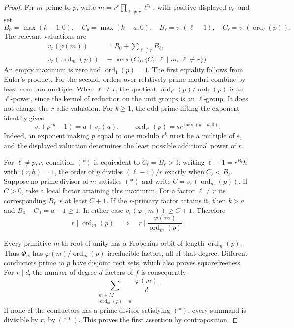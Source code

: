 \documentclass[11pt]{article}
\theoremstyle{definition}
\theoremstyle{remark}
\begin{document}
\begin{proof}
For $m$ prime to $p$, write
$m=r^k\prod_{\ell\ne r}\ell^{e_\ell}$, with positive displayed
$e_\ell$, and set
\[
 B_0=\max(k-1,0),\quad C_0=\max(k-a,0),\quad
 B_\ell=v_r(\ell-1),\quad
 C_\ell=v_r(\operatorname{ord}_\ell(p)).
\]
The relevant valuations are
\begin{align*}
 v_r(\varphi(m))&=B_0+\sum_{\ell\ne r}B_\ell,\\
 v_r(\operatorname{ord}_m(p))
   &=\max\bigl(C_0,\{C_\ell:\ell\mid m,\ \ell\ne r\}\bigr).
\end{align*}
An empty maximum is zero and $\operatorname{ord}_1(p)=1$.
The first equality follows from Euler's product.
For the second, orders over relatively prime moduli combine by least
common multiple.  When $\ell\ne r$, the quotient
$\operatorname{ord}_{\ell^{e}}(p)/\operatorname{ord}_\ell(p)$ is an
$\ell$-power, since the kernel of reduction on the unit groups is an
$\ell$-group.  It does not change the $r$-adic valuation.
For $k\ge1$, the odd-prime lifting-the-exponent identity gives
\[
 v_r(p^{su}-1)=a+v_r(u),\qquad
 \operatorname{ord}_{r^k}(p)=s r^{\max(k-a,0)}.
\]
Indeed, an exponent making $p$ equal to one modulo $r^k$ must be a
multiple of $s$, and the displayed valuation determines the least
possible additional power of $r$.

For $\ell\ne p,r$, condition \textup{\((*)\)} is equivalent to
$C_\ell=B_\ell>0$: writing $\ell-1=r^{B_\ell}h$ with $(r,h)=1$,
the order of $p$ divides $(\ell-1)/r$ exactly when
$C_\ell<B_\ell$.
Suppose no prime divisor of $m$ satisfies \textup{\((*)\)} and write
$C=v_r(\operatorname{ord}_m(p))$.
If $C>0$, take a local factor attaining this maximum.
For a factor $\ell\ne r$ its corresponding $B_\ell$ is at least
$C+1$.
If the $r$-primary factor attains it, then $k>a$ and
$B_0-C_0=a-1\ge1$.
In either case $v_r(\varphi(m))\ge C+1$.  Therefore
\[
 r\mid\operatorname{ord}_m(p)
 \quad\Longrightarrow\quad
 r\mid\frac{\varphi(m)}{\operatorname{ord}_m(p)}.
 \tag{\(**\)}
\]

Every primitive $m$-th root of unity has a Frobenius orbit of length
$\operatorname{ord}_m(p)$.  Thus $\Phi_m$ has
$\varphi(m)/\operatorname{ord}_m(p)$ irreducible factors, all of that
degree.  Different conductors prime to $p$ have disjoint root sets,
which also proves squarefreeness.  For $r\mid d$, the number of
degree-$d$ factors of $f$ is consequently
\[
 \sum_{\substack{m\in M\\\operatorname{ord}_m(p)=d}}
       \frac{\varphi(m)}d.
\]
If none of the conductors has a prime divisor satisfying
\textup{\((*)\)}, every summand is divisible by $r$, by
\textup{\((**)\)}.  This proves the first assertion by contraposition.


\end{proof}
\end{document}
